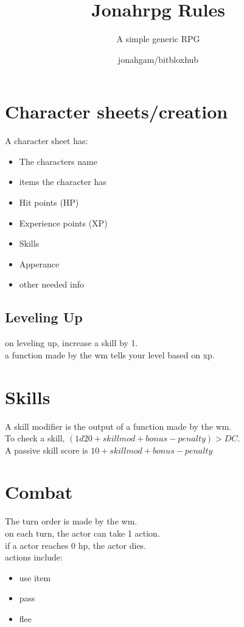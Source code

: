 \documentclass[fontsize=11pt,paper=a4,pagesize=auto,openany]{scrbook}
\begin{document}
  \title{Jonahrpg Rules}
  \subtitle{A simple generic RPG}
  \author{jonahgam/bitbloxhub}
  \maketitle
  \tableofcontents

  \chapter{Character sheets/creation}
    A character sheet has:

    \begin{itemize}
      \item The characters name
      \item items the character has
      \item Hit points (HP)
      \item Experience points (XP)
      \item Skills
      \item Apperance
      \item other needed info
    \end{itemize}

    \section{Leveling Up}
      on leveling up, increase a skill by 1.\\
      a function made by the \gls{wm} tells your level based on xp.

  \chapter{Skills}
    A skill modifier is the output of a function made by the \gls{wm}.\\
    To check a skill, \((1d20 + skillmod + bonus - penalty) > DC \).\\
    A passive skill score is \(10 + skillmod + bonus - penalty\)

  \chapter{Combat}
    The turn order is made by the \gls{wm}.\\
    on each turn, the actor can take 1 action.\\
    if a actor reaches 0 hp, the actor dies.\\
    actions include:
    \begin{itemize}
      \item use item
      \item pass
      \item flee
    \end{itemize}
\end{document}
